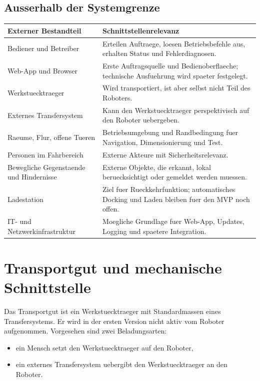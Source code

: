 \subsection{Ausserhalb der Systemgrenze}

\begin{longtable}{L{0.30\textwidth} L{0.58\textwidth}}
\toprule
Externer Bestandteil & Schnittstellenrelevanz \\
\midrule
Bediener und Betreiber & Erteilen Auftraege, loesen Betriebsbefehle aus, erhalten Status und Fehlerdiagnosen. \\
Web-App und Browser & Erste Auftragsquelle und Bedienoberflaeche; technische Ausfuehrung wird spaeter festgelegt. \\
Werkstuecktraeger & Wird transportiert, ist aber selbst nicht Teil des Roboters. \\
Externes Transfersystem & Kann den Werkstuecktraeger perspektivisch auf den Roboter uebergeben. \\
Raeume, Flur, offene Tueren & Betriebsumgebung und Randbedingung fuer Navigation, Dimensionierung und Test. \\
Personen im Fahrbereich & Externe Akteure mit Sicherheitsrelevanz. \\
Bewegliche Gegenstaende und Hindernisse & Externe Objekte, die erkannt, lokal beruecksichtigt oder gemeldet werden muessen. \\
Ladestation & Ziel fuer Rueckkehrfunktion; automatisches Docking und Laden bleiben fuer den MVP noch offen. \\
IT- und Netzwerkinfrastruktur & Moegliche Grundlage fuer Web-App, Updates, Logging und spaetere Integration. \\
\bottomrule
\end{longtable}

\section{Transportgut und mechanische Schnittstelle}

Das Transportgut ist ein Werkstuecktraeger mit Standardmassen eines Transfersystems. Er wird in der ersten Version nicht aktiv vom Roboter aufgenommen. Vorgesehen sind zwei Beladungsarten:
\begin{itemize}
  \item ein Mensch setzt den Werkstuecktraeger auf den Roboter,
  \item ein externes Transfersystem uebergibt den Werkstuecktraeger an den Roboter.
\end{itemize}

